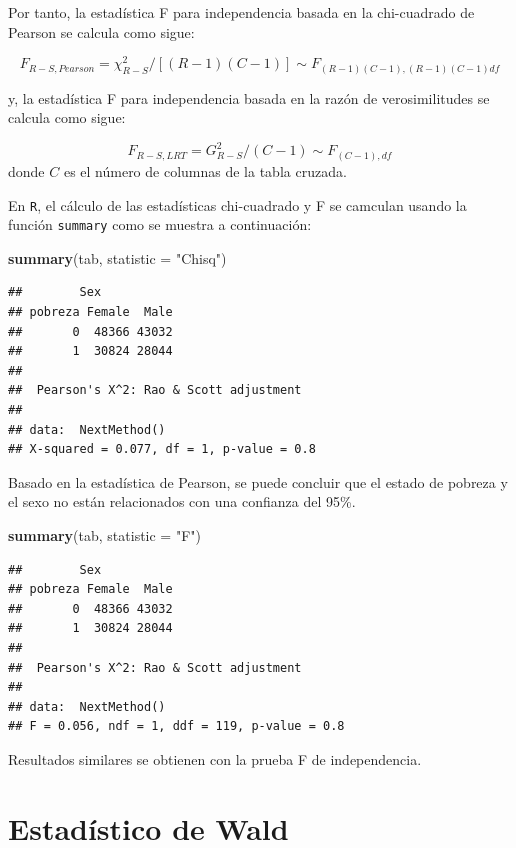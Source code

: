 \documentclass[
  12pt,
]{book}
\newenvironment{Shaded}{\begin{snugshade}}{\end{snugshade}}
\newcommand{\AttributeTok}[1]{\textcolor[rgb]{0.13,0.29,0.53}{#1}}
\newcommand{\FunctionTok}[1]{\textcolor[rgb]{0.13,0.29,0.53}{\textbf{#1}}}
\newcommand{\NormalTok}[1]{#1}
\newcommand{\StringTok}[1]{\textcolor[rgb]{0.31,0.60,0.02}{#1}}
\begin{document}
Por tanto, la estadística F para independencia basada en la chi-cuadrado de Pearson se calcula como sigue:

\[
F_{R-S,Pearson}=\chi_{R-S}^{2}\big/\left[\left(R-1\right)\left(C-1\right)\right]\sim F_{\left(R-1\right)\left(C-1\right),\left(R-1\right)\left(C-1\right)df}
\]

y, la estadística F para independencia basada en la razón de verosimilitudes se calcula como sigue:

\[
F_{R-S,LRT}=G_{R-S}^{2}\big/\left(C-1\right)\sim F_{\left(C-1\right),df}
\]
donde \(C\) es el número de columnas de la tabla cruzada.

En \texttt{R}, el cálculo de las estadísticas chi-cuadrado y F se camculan usando la función \texttt{summary} como se muestra a continuación:

\begin{Shaded}
\begin{Highlighting}[]
\FunctionTok{summary}\NormalTok{(tab, }\AttributeTok{statistic =} \StringTok{"Chisq"}\NormalTok{)}
\end{Highlighting}
\end{Shaded}

\begin{verbatim}
##        Sex
## pobreza Female  Male
##       0  48366 43032
##       1  30824 28044
## 
##  Pearson's X^2: Rao & Scott adjustment
## 
## data:  NextMethod()
## X-squared = 0.077, df = 1, p-value = 0.8
\end{verbatim}

Basado en la estadística de Pearson, se puede concluir que el estado de pobreza y el sexo no están relacionados con una confianza del 95\%.

\begin{Shaded}
\begin{Highlighting}[]
\FunctionTok{summary}\NormalTok{(tab, }\AttributeTok{statistic =} \StringTok{"F"}\NormalTok{)}
\end{Highlighting}
\end{Shaded}

\begin{verbatim}
##        Sex
## pobreza Female  Male
##       0  48366 43032
##       1  30824 28044
## 
##  Pearson's X^2: Rao & Scott adjustment
## 
## data:  NextMethod()
## F = 0.056, ndf = 1, ddf = 119, p-value = 0.8
\end{verbatim}

Resultados similares se obtienen con la prueba F de independencia.

\section{Estadístico de Wald}\label{estaduxedstico-de-wald}
\end{document}
